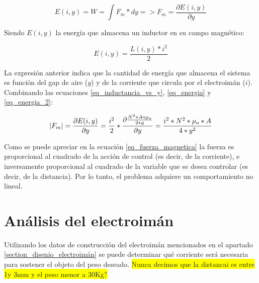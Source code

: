 \begin{equation}\label{eq_energia}
	E(i,y)=W=\int{F_{m}*dy}=>F_{m}=\frac{\partial{E(i,y)}}{\partial{y}}
\end{equation}

\noindent Siendo $E(i,y)$ la energía que almacena un inductor en su campo magnético:

\begin{equation}\label{eq_energia_2}
	E(i,y)=\frac{L(i,y)*i^{2}}{2}
\end{equation}

\noindent La expresión anterior indica que la cantidad de energía que almacena el sistema es función del gap de aire ($y$) y de la corriente que circula por el electroimán ($i$). Combinando las ecuaciones \ref{eq_inductancia_vs_y}, \ref{eq_energia} y \ref{eq_energia_2}:

\begin{equation}\label{eq_fuerza_magnetica}
	\lvert F_{m}\rvert=\frac{\partial{E(i,y)}}{\partial{y}}=\frac{i^{2}}{2}*\frac{\partial{\frac{{N^{2}*A*\mu_{o}}}{2*y}}}{\partial{y}}=\frac{i^{2}*N^{2}*\mu_{o}*A}{4*y^{2}}
\end{equation}

\noindent Como se puede apreciar en la ecuación \ref{eq_fuerza_magnetica} la fuerza es proporcional al cuadrado de la acción de control (es decir, de la corriente), e inversamente proporcional al cuadrado de la variable que se desea controlar (es decir, de la distancia). Por lo tanto, el problema adquiere un comportamiento no lineal.


\section{Análisis del electroimán}

\noindent Utilizando los datos de construcción del electroimán mencionados en el apartado \ref{section_disenio_electroimán} se puede determinar qué corriente será necesaria para sostener el objeto del peso deseado.
\colorbox{yellow}{Nunca decimos que la distancai es entre 1y 3mm y el peso menor a 30Kg?}
	


